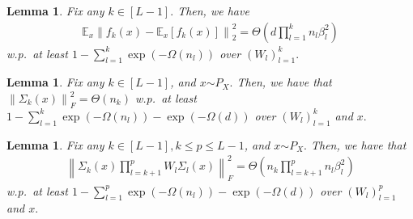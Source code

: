 \documentclass[11pt]{article}
\def\diag{\operatorname{\mathop{diag}}}
\newcommand{\E}{\mathbb{E}}
\newcommand{\distas}[1]{\mathbin{\overset{#1}{\sim}}}
\newtheorem{lemma}[theorem]{Lemma}
\newcommand{\bigO}[1]{\mathcal{O}\left(#1\right)}
\newcommand{\bigOmg}[1]{\Omega\left(#1\right)}
\newcommand{\bigTheta}[1]{\Theta\left(#1\right)}
\newcommand{\bigexp}[1]{\exp\left(#1\right)}
\newcommand{\norm}[1]{\left\|#1\right\|}
\newcommand{\svmax}[1]{\sigma_{\rm max}\left(#1\right)}
\def\max{\mathop{\rm max}\nolimits}
\begin{document}
\begin{lemma}\label{lem:Ex_square_fx}
    Fix any $k\in[L-1].$ Then, we have
    \begin{align*}
	    \E_x \norm{f_k(x) - \E_{x}[f_k(x)]}_2^2 = \bigTheta{ d \prod_{l=1}^k n_l\beta_l^2 }
    \end{align*}
    w.p.\ at least $1-\sum_{l=1}^k \bigexp{-\bigOmg{n_l}}$ over $(W_l)_{l=1}^k.$
\end{lemma}

\begin{lemma}\label{lem:frobnorm_SIGMA}
    Fix any $k\in[L-1]$, and $x\distas{}P_X.$ 
    Then, we have that $\norm{\Sigma_k(x)}_F^2=\bigTheta{n_k}$ w.p.\ at least $1-\sum_{l=1}^{k} \bigexp{-\bigOmg{n_l}} - \exp(-\bigOmg{d})$ over $(W_l)_{l=1}^{k}$ and $x.$
\end{lemma}

\begin{lemma}\label{lem:frobnorm_W_SIGMA}
    Fix any $k\in[L-1], k\leq p\leq L-1$, and $x\distas{}P_X.$
    Then, we have that
    \begin{align*}
	    \norm{\Sigma_{k}(x)\prod_{l=k+1}^{p} W_l\Sigma_l(x) }_F^2 
	    = \bigTheta{n_{k} \prod_{l=k+1}^{p} n_l\beta_l^2}
    \end{align*}
    w.p.\ at least
	$1 - \sum_{l=1}^{p} \bigexp{-\bigOmg{n_l}} - \exp(-\bigOmg{d})$
    over $(W_l)_{l=1}^{p}$ and $x.$
\end{lemma}
\end{document}

